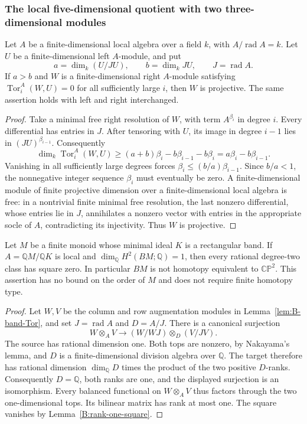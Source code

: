 \subsubsection{The local five-dimensional quotient with two three-dimensional modules}

\begin{lemma}\label{B:top-heavy-Tor}
Let $A$ be a finite-dimensional local algebra over a field $k$, with
$A/\operatorname{rad}A=k$.  Let $U$ be a finite-dimensional left $A$-module,
and put
\[
 a=\dim_k(U/JU),\qquad b=\dim_k JU,
 \qquad J=\operatorname{rad}A.
\]
If $a>b$ and $W$ is a finite-dimensional right $A$-module satisfying
$\operatorname{Tor}^A_i(W,U)=0$ for all sufficiently large $i$, then $W$
is projective.  The same assertion holds with left and right interchanged.
\end{lemma}
\begin{proof}
Take a minimal free right resolution of $W$, with term $A^{\beta_i}$ in
degree $i$.  Every differential has entries in $J$.  After tensoring with
$U$, its image in degree $i-1$ lies in $(JU)^{\beta_{i-1}}$.  Consequently
\[
 \dim_k\operatorname{Tor}^A_i(W,U)
 \geq (a+b)\beta_i-b\beta_{i-1}-b\beta_i
 =a\beta_i-b\beta_{i-1}.
\]
Vanishing in all sufficiently large degrees forces
$\beta_i\leq(b/a)\beta_{i-1}$.  Since $b/a<1$, the nonnegative integer
sequence $\beta_i$ must eventually be zero.  A finite-dimensional module
of finite projective dimension over a finite-dimensional local algebra
is free: in a nontrivial finite minimal free resolution, the last
nonzero differential, whose entries lie in $J$, annihilates a nonzero
vector with entries in the appropriate socle of $A$, contradicting its
injectivity.  Thus $W$ is projective.
\end{proof}

\begin{proposition}\label{B:local-quotient-CP2}
Let $M$ be a finite monoid whose minimal ideal $K$ is a rectangular
band.  If $A=\mathbb Q M/\mathbb Q K$ is local and
$\dim_{\mathbb Q}H^2(BM;\mathbb Q)=1$, then every rational
degree-two class has square zero.  In particular $BM$ is not
homotopy equivalent to $\mathbb{CP}^2$.  This assertion has no bound
on the order of $M$ and does not require finite homotopy type.
\end{proposition}
\begin{proof}
Let $W,V$ be the column and row augmentation modules in
Lemma~\ref{lem:B-band-Tor}, and set $J=\operatorname{rad}A$ and
$D=A/J$.  There is a canonical surjection
\[
 W\otimes_A V\longrightarrow
 (W/WJ)\otimes_D(V/JV).
\]
The source has rational dimension one.  Both tops are nonzero, by
Nakayama's lemma, and $D$ is a finite-dimensional division algebra
over $\mathbb Q$.  The target therefore has rational dimension
$\dim_{\mathbb Q}D$ times the product of the two positive $D$-ranks.
Consequently $D=\mathbb Q$, both ranks are one, and the displayed
surjection is an isomorphism.  Every balanced functional on
$W\otimes_A V$ thus factors through the two one-dimensional tops.
Its bilinear matrix has rank at most one.  The square vanishes by
Lemma~\ref{B:rank-one-square}.
\end{proof}

